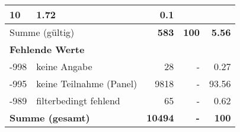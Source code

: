 \begin{longtable}{lXrrr}
       \num{10} &
       \num[round-mode=places,round-precision=2]{1.72} &
         \num[round-mode=places,round-precision=2]{0.1} \\
     \midrule
     \multicolumn{2}{l}{Summe (gültig)} &
       \textbf{\num{583}} &
     \textbf{\num{100}} &
       \textbf{\num[round-mode=places,round-precision=2]{5.56}} \\
     \multicolumn{5}{l}{\textbf{Fehlende Werte}}\\
       -998 &
       keine Angabe &
         \num{28} &
        - &
         \num[round-mode=places,round-precision=2]{0.27} \\
       -995 &
       keine Teilnahme (Panel) &
         \num{9818} &
        - &
         \num[round-mode=places,round-precision=2]{93.56} \\
       -989 &
       filterbedingt fehlend &
         \num{65} &
        - &
         \num[round-mode=places,round-precision=2]{0.62} \\
     \midrule
     \multicolumn{2}{l}{\textbf{Summe (gesamt)}} &
          \textbf{\num{10494}} &
        \textbf{-} &
        \textbf{\num{100}} \\
     \bottomrule
     \end{longtable}
     
